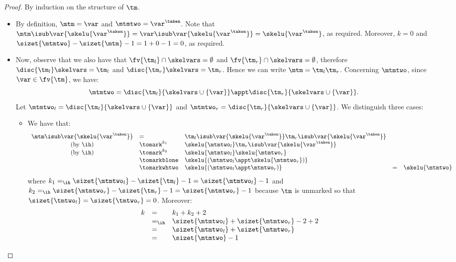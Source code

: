 

\begin{proof}
 By induction on the structure of $\tm$.
\begin{itemize}
\item \case{$\tm = \var$} By definition, $\mtm=\var$ and $\mtmtwo = \var^\taken$. Note that $\mtm\isub\var{\skelu{\var^\taken}} = \var\isub\var{\skelu{\var^\taken}} = \skelu{\var^\taken}$, as required.
Moreover, $k = 0$ and $\sizet{\mtmtwo} - \sizet{\mtm}-1=1+0-1=0$, as required.

\item {} Now, observe that we also have that $\fv{\tm_l} \cap \skelvars = \emptyset$ and $\fv{\tm_r} \cap \skelvars = \emptyset$, therefore $\disc{\tm_l}\skelvars = \tm_l$ and $\disc{\tm_r}\skelvars=\tm_r$. Hence we can write $\mtm = \tm_l \tm_r$.
Concerning $\mtmtwo$, since $\var \in \fv{\tm}$, we have:
\[ \mtmtwo = \disc{\tm_l}{\skelvars\cup\{\var\}}\appt\disc{\tm_r}{\skelvars\cup\{\var\}}.\]
Let $\mtmtwo_l = \disc{\tm_l}{\skelvars \cup \{\var\}}$ and $\mtmtwo_r = \disc{\tm_r}{\skelvars \cup \{\var\}}$. We distinguish three cases:
\begin{itemize}
\item {} We have that:
\[\begin{array}{cllllll}
\mtm\isub\var{\skelu{\var^\taken}} &= &
  \tm_l\isub\var{\skelu{\var^\taken}} \tm_r\isub\var{\skelu{\var^\taken}} 
  \\
  \mbox{(by \ih)} &\tomark^{k_1} &
  \skelu{\mtmtwo_l} \tm_r\isub\var{\skelu{\var^\taken}} 
  \\
  \mbox{(by \ih)} &\tomark^{k_2} &
  \skelu{\mtmtwo_l} \skelu{\mtmtwo_r} 
  \\
  &\tomarkblone &
  \skelu{(\mtmtwo_l \appt\skelu{\mtmtwo_r})} 
  \\
  &\tomarkwhtwo &
  \skelu{(\mtmtwo_l\appt\mtmtwo_r)} 
  &=& \skelu{\mtmtwo}
\end{array}\]
where $k_1 =_{\ih} \sizet{\mtmtwo_l} - \sizet{\tm_l} -1= \sizet{\mtmtwo_l} -1$ and $k_2 =_{\ih} \sizet{\mtmtwo_r} - \sizet{\tm_r}-1 = \sizet{\mtmtwo_r}-1$ because $\tm$ is unmarked so that $\sizet{\tmtwo_l} = \sizet{\tmtwo_r} = 0$.
Moreover:
\[\begin{array}{lllllll}
k & = &  k_1 + k_2 +2
\\
& =_{\ih} & \sizet{\mtmtwo_l} + \sizet{\mtmtwo_r} -2 +2
\\
& = & \sizet{\mtmtwo_l} + \sizet{\mtmtwo_r}
\\
& = & \sizet{\mtmtwo} -1


\end{array}\]
\end{itemize}
\end{itemize}
\end{proof}
